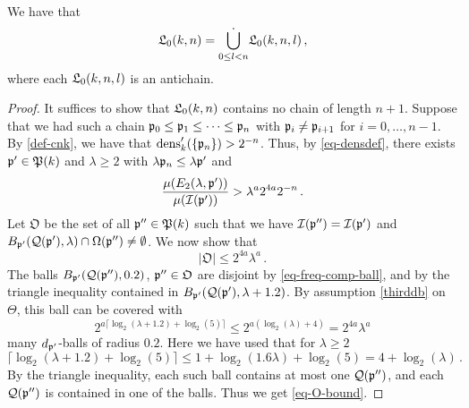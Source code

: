\begin{lemma}[L0 antichain]
\label{L0-antichain}
\leanok
{}
    We have that
    $$
        {\mathfrak L}_0(k,n) = \dot{\bigcup_{0 \le l < n}} {\mathfrak L}_0(k,n,l)\,,
    $$
    where each ${\mathfrak L}_0(k,n,l)$ is an antichain.
\end{lemma}

\begin{proof}
    \leanok
    It suffices to show that ${\mathfrak L}_0(k,n)$ contains no chain of length $n + 1$. Suppose that we had such a chain ${\mathfrak p}_0 \le {\mathfrak p}_1 \le \dotsb \le {\mathfrak p}_{n}$ with ${\mathfrak p}_i \ne {\mathfrak p}_{i+1}$ for $i =0, \dotsc, n-1$. By \eqref{def-cnk}, we have that $\operatorname{\operatorname{dens}}_k'(\{{\mathfrak p}_n\}) > 2^{-n}$. Thus, by \eqref{eq-densdef}, there exists ${\mathfrak p}' \in {\mathfrak P}(k)$ and $\lambda \ge 2$ with $\lambda {\mathfrak p}_n \le \lambda {\mathfrak p}'$ and
    \begin{equation}
        \label{eq-p'}
        \frac{\mu(E_2(\lambda, {\mathfrak p}'))}{\mu({\mathcal{I}}({\mathfrak p}'))} > \lambda^{a} 2^{4a} 2^{-n}\,.
    \end{equation}
    Let $\mathfrak{O}$ be the set of all ${\mathfrak p}'' \in {\mathfrak P}(k)$ such that we have $ {\mathcal{I}}({\mathfrak p}'') = {\mathcal{I}}({\mathfrak p}')$ and $B_{{\mathfrak p}'}({\mathcal{Q}}({\mathfrak p}'), \lambda) \cap \Omega({\mathfrak p}'') \neq \emptyset$.
    We now show that
    \begin{equation}
        \label{eq-O-bound}
        |\mathfrak{O}| \le 2^{4a}\lambda^a\,.
    \end{equation}
    The balls $B_{{\mathfrak p}'}({\mathcal{Q}}({\mathfrak p}''), 0.2)$, ${\mathfrak p}'' \in \mathfrak{O}$ are disjoint by \eqref{eq-freq-comp-ball},
    and by the triangle inequality contained in $B_{{\mathfrak p}'}({\mathcal{Q}}({\mathfrak p}'), \lambda+1.2)$.
    By assumption \eqref{thirddb} on $\Theta$, this ball can be covered with
    $$
        2^{a\lceil \log_2(\lambda+1.2) + \log_2(5)\rceil} \le 2^{a(\log_2(\lambda) + 4)} = 2^{4a}\lambda^a
    $$
    many $d_{{\mathfrak p}'}$-balls of radius $0.2$. Here we have used that for $\lambda \ge 2$
    $$
        \lceil \log_2(\lambda + 1.2)  + \log_2(5) \rceil \le 1+ \log_2(1.6  \lambda) + \log_2(5) = 4 + \log_2(\lambda)\,.
    $$
    By the triangle inequality, each such ball contains at most one ${\mathcal{Q}}({\mathfrak p}'')$, and each ${\mathcal{Q}}({\mathfrak p}'')$ is contained in one of the balls. Thus we get \eqref{eq-O-bound}.


\end{proof}
